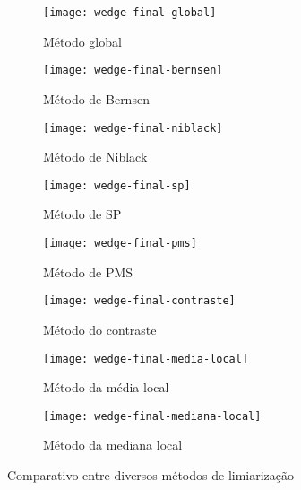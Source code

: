 \documentclass[brazilian,a4paper,twocolumn]{article}
\begin{document}
        \begin{figure}[H]
            \centering
            \begin{subfigure}{0.23\textwidth}
                \texttt{[image: wedge-final-global]}
                \caption{Método global}
                \label{fig:wedge-global}
            \end{subfigure}
            \begin{subfigure}{0.23\textwidth}
                \texttt{[image: wedge-final-bernsen]}
                \caption{Método de Bernsen}
                \label{fig:wedge-bernsen}
            \end{subfigure}
            \begin{subfigure}{0.23\textwidth}
                \texttt{[image: wedge-final-niblack]}
                \caption{Método de Niblack}
                \label{fig:wedge-niblack}
            \end{subfigure}
            \begin{subfigure}{0.23\textwidth}
                \texttt{[image: wedge-final-sp]}
                \caption{Método de SP}
                \label{fig:wedge-sp}
            \end{subfigure}
            \begin{subfigure}{0.23\textwidth}
                \texttt{[image: wedge-final-pms]}
                \caption{Método de PMS}
                \label{fig:wedge-pms}
            \end{subfigure}
            \begin{subfigure}{0.23\textwidth}
                \texttt{[image: wedge-final-contraste]}
                \caption{Método do contraste}
                \label{fig:wedge-contraste}
            \end{subfigure}
            \begin{subfigure}{0.23\textwidth}
                \texttt{[image: wedge-final-media-local]}
                \caption{Método da média local}
                \label{fig:wedge-media}
            \end{subfigure}
            \begin{subfigure}{0.23\textwidth}
                \texttt{[image: wedge-final-mediana-local]}
                \caption{Método da mediana local}
                \label{fig:wedge-mediana}
            \end{subfigure}

            \caption{Comparativo entre diversos métodos de limiarização}
            \label{fig:wedge-limiarizacao}
        \end{figure}
\end{document}
